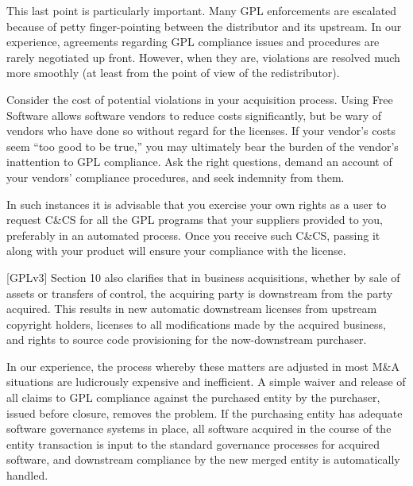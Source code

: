 This last point is particularly important.  Many GPL enforcements are
escalated because of petty finger-pointing between the distributor and its
upstream.  In our experience, agreements regarding GPL compliance issues
and procedures are rarely negotiated up front.  However, when they are,
violations are resolved much more smoothly (at least from the point of
view of the redistributor).

Consider the cost of potential violations in your acquisition process.
Using Free Software allows software vendors to reduce costs significantly, but be
wary of vendors who have done so without regard for the licenses.  If your
vendor's costs seem ``too good to be true,'' you may ultimately bear the
burden of the vendor's inattention to GPL compliance.  Ask the right
questions, demand an account of your vendors' compliance procedures, and
seek indemnity from them.


In such instances it is advisable that you exercise your own rights as a user
to request C\&CS for all the GPL programs that your suppliers provided to you,
preferably in an automated process. Once you receive such C\&CS, passing it
along with your product will ensure your compliance with the license.


[GPLv3] Section 10 also clarifies that in business acquisitions, whether by
sale of assets or transfers of control, the acquiring party is downstream
from the party acquired. This results in new automatic downstream licenses
from upstream copyright holders, licenses to all modifications made by the
acquired business, and rights to source code provisioning for the
now-downstream purchaser.

In our experience, the process whereby these matters are adjusted in most M\&A
situations are ludicrously expensive and inefficient. A simple waiver and
release of all claims to GPL compliance against the purchased entity by the
purchaser, issued before closure, removes the problem. If the purchasing
entity has adequate software governance systems in place, all software
acquired in the course of the entity transaction is input to the standard
governance processes for acquired software, and downstream compliance by the
new merged entity is automatically handled.

